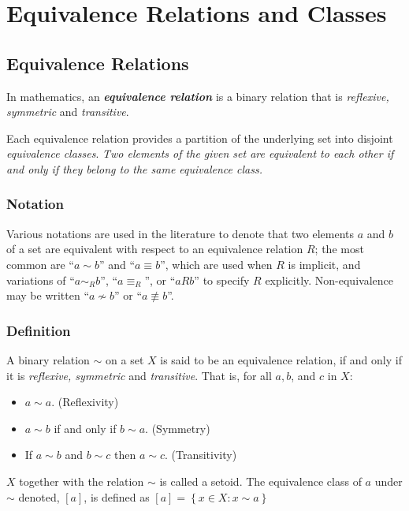 \section{Equivalence Relations and Classes}

\begin{multicols}{2}
\setlength{\columnsep}{1.5cm}
\setlength{\columnseprule}{0.2pt}

\subsection{Equivalence Relations}

In mathematics, an \textbf{\textit{equivalence relation}} is a binary relation that is \textit{reflexive, symmetric} and \textit{transitive}. 

Each equivalence relation provides a partition of the underlying set into disjoint \textit{equivalence classes}. \textit{Two elements of the given set are equivalent to each other if and only if they belong to the same equivalence class.}

\subsubsection{Notation}

Various notations are used in the literature to denote that two elements $a$ and $b$ of a set are equivalent with respect to an equivalence relation $R$; the most common are ``$a \sim b$'' and ``$a \equiv b$'', which are used when $R$ is implicit, and variations of ``$a \sim_{R} b$'', ``$a \equiv_R$'', or ``$a R b$'' to specify $R$ explicitly. Non-equivalence may be written ``$a \not\sim b$'' or ``$a \not\equiv b$''.

\vfill\null
\columnbreak

\subsubsection{Definition}

A binary relation $\sim$ on a set $X$ is said to be an equivalence relation, if and only if it is \textit{reflexive, symmetric} and \textit{transitive}. That is, for all $a, b$, and $c$ in $X$:
\begin{itemize}
    \item $a \sim a$. (Reflexivity)
    \item $a \sim b$ if and only if $b \sim a$. (Symmetry)
    \item If $a \sim b$ and $b \sim c$ then $a \sim c$. (Transitivity)
\end{itemize}
$X$ together with the relation $\sim$ is called a setoid. The equivalence class of $a$ under $\sim$ denoted, $\left[ a \right]$, is defined as $\left[ a \right] = \left\{ x \in X : x \sim a \right\}$


\end{multicols}
